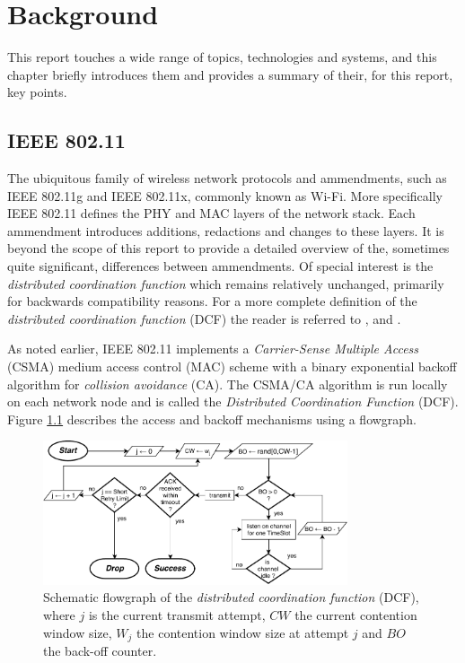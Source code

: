 
\chapter{Background}

This report touches a wide range of topics, technologies and systems, and this
chapter briefly introduces them and provides a summary of their, for this
report, key points.

\section{IEEE 802.11}

The ubiquitous family of wireless network protocols and ammendments, such as
IEEE 802.11g and IEEE 802.11x, commonly known as Wi-Fi. More specifically IEEE
802.11 defines the PHY and MAC layers of the network stack. Each ammendment
introduces additions, redactions and changes to these layers. It is beyond the
scope of this report to provide a detailed overview of the, sometimes quite
significant, differences between ammendments. Of special interest is the
\emph{distributed coordination function} which remains relatively unchanged,
primarily for backwards compatibility reasons. For a more complete definition
of the \emph{distributed coordination function} (DCF) the reader is referred
to \cite{654749}, \cite{5307322} and \cite{6687187}. 

As noted earlier, IEEE 802.11 implements a \emph{Carrier-Sense Multiple
Access} (CSMA) medium access control (MAC) scheme with a binary exponential
backoff algorithm for \emph{collision avoidance} (CA). The CSMA/CA algorithm
is run locally on each network node and is called the \emph{Distributed
Coordination Function} (DCF). Figure \ref{fig:dcfgraph} describes the access
and backoff mechanisms using a flowgraph.

\begin{figure}
\center
\includegraphics[width=0.8\textwidth]{images/ieee-80211-dcf.pdf}
\caption{Schematic flowgraph of the \emph{distributed coordination function} (DCF), where $j$ is the current transmit attempt, $CW$ the current contention window size, $W_j$ the contention window size at attempt $j$ and $BO$ the back-off counter.}
\label{fig:dcfgraph}
\end{figure}


